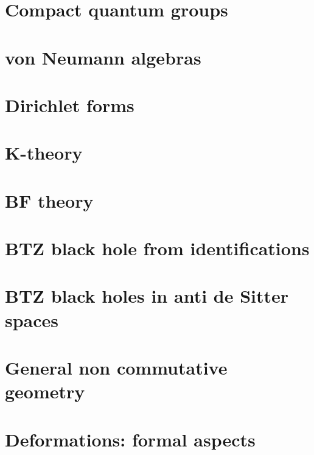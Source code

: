 \chapter{Compact quantum groups}


\chapter{von Neumann algebras}





\chapter{Dirichlet forms}


\chapter{K-theory}


\chapter{BF theory}


\chapter{BTZ black hole from identifications}




\chapter{BTZ black holes in anti de Sitter spaces}                  \label{ChapBHinAdS}
%
%










\chapter{General non commutative geometry}




\chapter{Deformations: formal aspects}          \label{ChapDefo}


